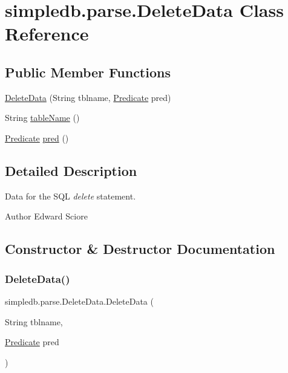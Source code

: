 \hypertarget{classsimpledb_1_1parse_1_1DeleteData}{}\section{simpledb.\+parse.\+Delete\+Data Class Reference}
\label{classsimpledb_1_1parse_1_1DeleteData}
\subsection*{Public Member Functions}
\begin{DoxyCompactItemize}
\item 
\hyperlink{classsimpledb_1_1parse_1_1DeleteData_a96e3f2aca2ea1c0a70345733ab1e1171}{Delete\+Data} (String tblname, \hyperlink{classsimpledb_1_1query_1_1Predicate}{Predicate} pred)
\item 
String \hyperlink{classsimpledb_1_1parse_1_1DeleteData_aa9b6a4399b885c2da9c3dd711cbd9b52}{table\+Name} ()
\item 
\hyperlink{classsimpledb_1_1query_1_1Predicate}{Predicate} \hyperlink{classsimpledb_1_1parse_1_1DeleteData_af248433241e8e934222dba32a25a32a5}{pred} ()
\end{DoxyCompactItemize}


\subsection{Detailed Description}
Data for the S\+QL {\itshape delete} statement. \begin{DoxyAuthor}{Author}
Edward Sciore 
\end{DoxyAuthor}


\subsection{Constructor \& Destructor Documentation}
\mbox{\label{classsimpledb_1_1parse_1_1DeleteData_a96e3f2aca2ea1c0a70345733ab1e1171}} 
\subsubsection{\texorpdfstring{Delete\+Data()}{DeleteData()}}
{\footnotesize\ttfamily simpledb.\+parse.\+Delete\+Data.\+Delete\+Data (\begin{DoxyParamCaption}\item[{String}]{tblname,  }\item[{\hyperlink{classsimpledb_1_1query_1_1Predicate}{Predicate}}]{pred }\end{DoxyParamCaption})\hspace{0.3cm}{\ttfamily [inline]}}

